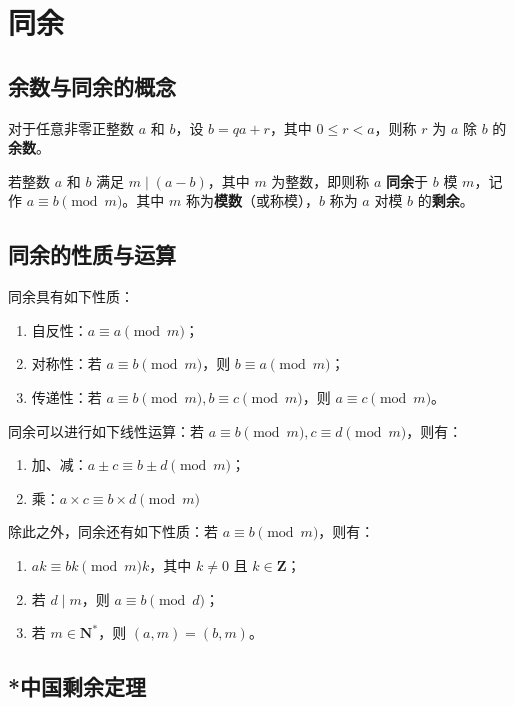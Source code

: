 \section{同余}

\subsection{余数与同余的概念}

对于任意非零正整数 $a$ 和 $b$，设 $b = qa+ r$，其中 $0 \leq r < a$，则称 $r$ 为 $a$ 除 $b$ 的\textbf{余数}。

若整数 $a$ 和 $b$ 满足 $m \mid (a-b)$，其中 $m$ 为整数，即则称 $a$ \textbf{同余}于 $b$ 模 $m$，记作 $a \equiv b \pmod m$。其中 $m$ 称为\textbf{模数}（或称模），$b$ 称为 $a$ 对模 $b$ 的\textbf{剩余}。

\subsection{同余的性质与运算}

同余具有如下性质：

\begin{enumerate}
\item 自反性：$a \equiv a \pmod m$；
\item 对称性：若 $a \equiv b \pmod m$，则 $b \equiv a \pmod m$；
\item 传递性：若 $a \equiv b \pmod m, b \equiv c \pmod m$，则 $a \equiv c \pmod m$。
\end{enumerate}

同余可以进行如下线性运算：若 $a \equiv b \pmod m, c \equiv d \pmod m$，则有：

\begin{enumerate}
\item 加、减：$a \pm c \equiv b \pm d \pmod m$；
\item 乘：$a \times c \equiv b \times d \pmod m$
\end{enumerate}

除此之外，同余还有如下性质：若 $a \equiv b \pmod m$，则有：

\begin{enumerate}
\item $ak \equiv bk \pmod mk$，其中 $k \neq 0$ 且 $k \in \mathbf{Z}$；
\item 若 $d \mid m$，则 $a \equiv b \pmod d$；
\item 若 $m \in \mathbf{N}^*$，则 $(a, m) = (b, m)$。
\end{enumerate}

\subsection{*中国剩余定理}

